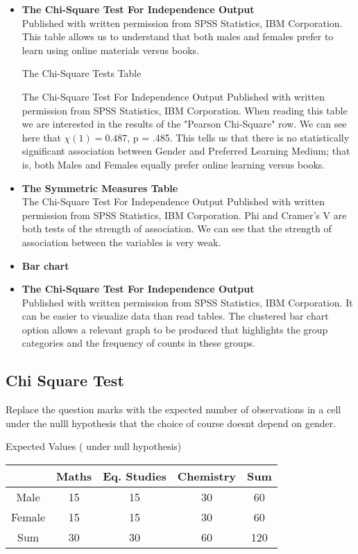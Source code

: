 \documentclass[00-IntroStatsMaster.tex]{subfiles}
\begin{document}
\begin{itemize}
\item \textbf{The Chi-Square Test For Independence Output}\\
Published with written permission from SPSS Statistics, IBM Corporation.
This table allows us to understand that both males and females prefer to learn using online materials versus books.

The Chi-Square Tests Table

The Chi-Square Test For Independence Output
Published with written permission from SPSS Statistics, IBM Corporation.
When reading this table we are interested in the results of the "Pearson Chi-Square" row. We can see here that $\chi(1) = 0.487$, p = .485. This tells us that there is no statistically significant association between Gender and Preferred Learning Medium; that is, both Males and Females equally prefer online learning versus books.

\item \textbf{The Symmetric Measures Table}\\

The Chi-Square Test For Independence Output
Published with written permission from SPSS Statistics, IBM Corporation.
Phi and Cramer's V are both tests of the strength of association. We can see that the strength of association between the variables is very weak.

\item \textbf{Bar chart}\\

\item \textbf{The Chi-Square Test For Independence Output}\\
Published with written permission from SPSS Statistics, IBM Corporation.
It can be easier to visualize data than read tables. The clustered bar chart option allows a relevant graph to be produced that highlights the group categories and the frequency of counts in these groups.
\end{itemize}
\subsection{Chi Square Test }
Replace the question marks with the expected number of observations
in a cell under the nulll hypothesis that the choice of course doesnt depend on gender.

Expected Values ( under null hypothesis)

\begin{center}
	\begin{tabular}{|c|c|c|c|c|} \hline 
		& Maths & Eq. Studies & Chemistry & Sum \\ \hline
		Male & 15 & 15 & 30& 60 \\ \hline 
		Female & 15 & 15 & 30& 60 \\ \hline
		Sum & 30 & 30 & 60 & 120   \hline
	\end{tabular} 
\end{center}
\end{document}

